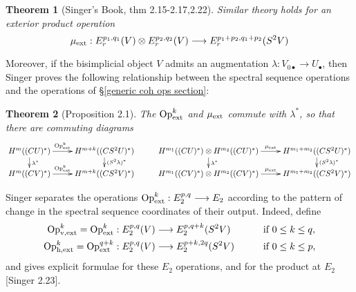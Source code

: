 \documentclass[11pt]{amsart}
\theoremstyle{plain}
\newtheorem{thm}{Theorem}[section]
\theoremstyle{definition}
\renewcommand{\to}{\longrightarrow}
\theoremstyle{plain}
\newcommand{\ExtCohOp}{\textup{Op}_\textup{ext}}
\newcommand{\vExtCohOp}{\textup{Op}_\textup{v,ext}}
\newcommand{\hExtCohOp}{\textup{Op}_\textup{h,ext}}
\newcommand{\ExtCohProd}{\mu_\textup{ext}}
\newcommand{\Sq}{\mathrm{Sq}}
\begin{document}
\begin{Composite functor spectral sequences}
\begin{thm}[Singer's Book, thm 2.15-2.17,2.22]
Similar theory holds for an exterior product operation
\[\ExtCohProd:E_r^{p_1,q_1}(V)\otimes E_r^{p_2,q_2}(V)\to E_r^{p_1+p_2,q_1+p_2}(S^2V)\]
\end{thm}
Moreover, if the bisimplicial object $V$ admits an augmentation $\lambda:V_{0\bullet}\to U_{\bullet}$, then %
Singer proves the following relationship between the spectral sequence operations and the operations of \S\ref{generic coh ops section}:
\begin{thm}[Proposition 2.1]
The $\ExtCohOp^k$ and $\ExtCohProd$ commute with $\lambda^*$, so that there are commuting diagrams
\[\xymatrix@R=4mm{
H^{m}((CU)^*)\ar[r]^-{\ExtCohOp^k}
\ar[d]^-{\lambda^*}
&%
H^{m+k}((CS^2U)^*)\ar[d]^-{(S^2\lambda)^*}
&%
H^{m_1}((CU)^*)\otimes H^{m_2}((CU)^*)\ar[r]^-{\ExtCohProd}
\ar[d]^-{\lambda^*}
&%
H^{m_1+m_2}((CS^2U)^*)\ar[d]^-{(S^2\lambda)^*}
\\%
H^{m}((CV)^*)\ar[r]^-{\ExtCohOp^k}
&%
H^{m+k}((CS^2V)^*)
&%
H^{m_1}((CV)^*)\otimes H^{m_2}((CV)^*)\ar[r]^-{\ExtCohProd}
&%
H^{m_1+m_2}((CS^2V)^*)
}\]
\end{thm}

Singer separates the operations $\ExtCohOp^k:E^{p,q}_2\to E_{2}$ according to the pattern of change in the spectral sequence coordinates of their output. Indeed, define
\begin{alignat*}{2}
\vExtCohOp^k=\ExtCohOp^k:E^{p,q}_2(V)&\to E^{p,q+k}_2(S^2V)&\qquad&\text{if }0\leq k \leq q,\\
\hExtCohOp^k=\ExtCohOp^{q+k}:E^{p,q}_2(V)&\to E^{p+k,2q}_2(S^2V)&\qquad&\text{if }0\leq k \leq p,
\end{alignat*}
and gives explicit formulae for these $E_2$ operations, and for the product at $E_2$ [Singer 2.23].



\end{Composite functor spectral sequences}
\end{document}
